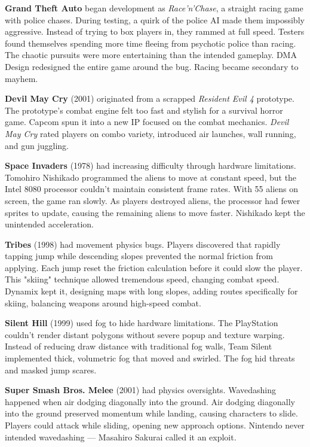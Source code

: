 \textbf{Grand Theft Auto} began development as \emph{Race'n'Chase}, a straight racing game with police chases. During testing, a quirk of the police AI made them impossibly aggressive. Instead of trying to box players in, they rammed at full speed.  Testers found themselves spending more time fleeing from psychotic police than racing. The chaotic pursuits were more entertaining than the intended gameplay. DMA Design redesigned the entire game around the bug. Racing became secondary to mayhem.

\textbf{Devil May Cry} (2001) originated from a scrapped \emph{Resident Evil 4} prototype. The prototype's combat engine felt too fast and stylish for a survival horror game. Capcom spun it into a new IP focused on the combat mechanics. \emph{Devil May Cry} rated players on combo variety, introduced air launches, wall running, and gun juggling.

\textbf{Space Invaders} (1978) had increasing difficulty through hardware limitations. Tomohiro Nishikado programmed the aliens to move at constant speed, but the Intel 8080 processor couldn't maintain consistent frame rates. With 55 aliens on screen, the game ran slowly. As players destroyed aliens, the processor had fewer sprites to update, causing the remaining aliens to move faster.  Nishikado kept the unintended acceleration.

\textbf{Tribes} (1998) had movement physics bugs. Players discovered that rapidly tapping jump while descending slopes prevented the normal friction from applying. Each jump reset the friction calculation before it could slow the player. This "skiing" technique allowed tremendous speed, changing combat speed. Dynamix kept it, designing maps with long slopes, adding routes specifically for skiing, balancing weapons around high-speed combat.

\textbf{Silent Hill} (1999) used fog to hide hardware limitations. The PlayStation couldn't render distant polygons without severe popup and texture warping. Instead of reducing draw distance with traditional fog walls, Team Silent implemented thick, volumetric fog that moved and swirled.  The fog hid threats and masked jump scares.

\textbf{Super Smash Bros. Melee} (2001) had physics oversights. Wavedashing happened when air dodging diagonally into the ground. Air dodging diagonally into the ground preserved momentum while landing, causing characters to slide. Players could attack while sliding, opening new approach options. Nintendo never intended wavedashing — Masahiro Sakurai called it an exploit. 

